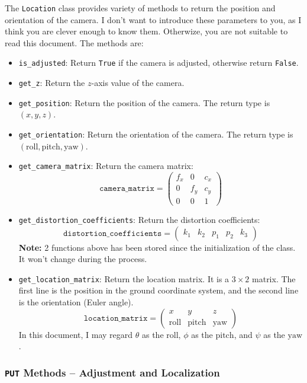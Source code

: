 \documentclass{article}
\begin{document}
The \texttt{Location} class provides variety of methods to return the position and orientation of the camera. I don't want to introduce these parameters to you, as I think you are clever enough to know them. Otherwize, you are not suitable to read this document. The methods are:

\begin{itemize}
  \item \texttt{is\_adjusted}: Return \texttt{True} if the camera is adjusted, otherwise return \texttt{False}.
  \item \texttt{get\_z}: Return the $z$-axis value of the camera.
  \item \texttt{get\_position}: Return the position of the camera. The return type is $\left(x,y,z\right)$.
  \item \texttt{get\_orientation}: Return the orientation of the camera. The return type is $\left(\mathrm{roll},\mathrm{pitch},\mathrm{yaw}\right)$.
  \item \texttt{get\_camera\_matrix}: Return the camera matrix:
  \[
    \texttt{camera\_matrix}=\left(\begin{matrix}
      f_x & 0 & c_x \\
      0 & f_y & c_y \\
      0 & 0 & 1
    \end{matrix}\right)
  \]
  \item \texttt{get\_distortion\_coefficients}: Return the distortion coefficients:
  \[
    \texttt{distortion\_coefficients}=\left(\begin{matrix}
      k_1 & k_2 & p_1 & p_2 & k_3
    \end{matrix}\right)
  \]
  \textbf{Note: } 2 functions above has been stored since the initialization of the class. It won't change during the process.
  \item \texttt{get\_location\_matrix}: Return the location matrix. It is a $3\times2$ matrix. The first line is the position in the ground coordinate system, and the second line is the orientation (Euler angle).
  \[
    \texttt{location\_matrix}=\left(\begin{matrix}
      x & y & z \\
      \mathrm{roll} & \mathrm{pitch} & \mathrm{yaw}
    \end{matrix}\right)
  \]
  In this document, I may regard $\theta$ as the $\mathrm{roll}$, $\phi$ as the $\mathrm{pitch}$, and $\psi$ as the $\mathrm{yaw}$.
\end{itemize}

\subsubsection{\texttt{PUT} Methods -- Adjustment and Localization}
\end{document}

